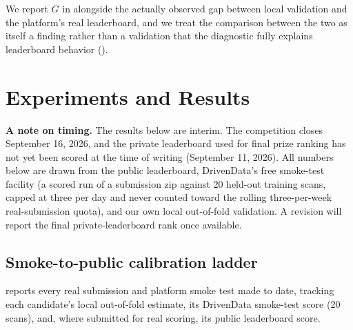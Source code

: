 \documentclass[10pt]{article}
\newcommand{\shiftgap}{\ensuremath{G}}
\begin{document}
We report \shiftgap{} in  alongside the actually observed gap between local validation and the platform's real leaderboard, and we treat the comparison between the two as itself a finding rather than a validation that the diagnostic fully explains leaderboard behavior ().

\section{Experiments and Results}
\label{sec:results}

\textbf{A note on timing.} The results below are interim. The competition closes September 16, 2026, and the private leaderboard used for final prize ranking has not yet been scored at the time of writing (September 11, 2026). All numbers below are drawn from the public leaderboard, DrivenData's free smoke-test facility (a scored run of a submission zip against 20 held-out training scans, capped at three per day and never counted toward the rolling three-per-week real-submission quota), and our own local out-of-fold validation. A revision will report the final private-leaderboard rank once available.

\subsection{Smoke-to-public calibration ladder}

 reports every real submission and platform smoke test made to date, tracking each candidate's local out-of-fold estimate, its DrivenData smoke-test score (20 scans), and, where submitted for real scoring, its public leaderboard score.
\end{document}
